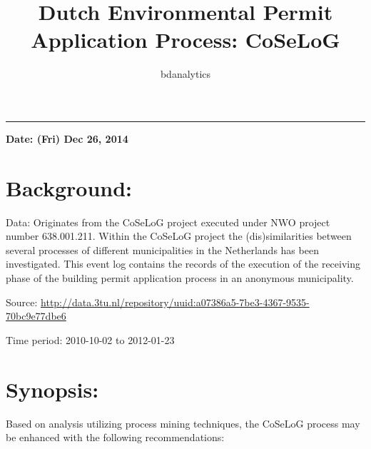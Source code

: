 \documentclass[]{article}
\title{Dutch Environmental Permit Application Process: CoSeLoG}
\author{bdanalytics}
\date{}
\begin{document}
\maketitle


{
\hypersetup{linkcolor=black}
\setcounter{tocdepth}{2}
\tableofcontents
}
\begin{center}\rule{0.5\linewidth}{\linethickness}\end{center}

\textbf{Date: (Fri) Dec 26, 2014}

\section{Background:}\label{background}

Data: Originates from the CoSeLoG project executed under NWO project
number 638.001.211. Within the CoSeLoG project the (dis)similarities
between several processes of different municipalities in the Netherlands
has been investigated. This event log contains the records of the
execution of the receiving phase of the building permit application
process in an anonymous municipality.

Source:
\url{http://data.3tu.nl/repository/uuid:a07386a5-7be3-4367-9535-70bc9e77dbe6}

Time period: 2010-10-02 to 2012-01-23

\section{Synopsis:}\label{synopsis}

Based on analysis utilizing process mining techniques, the CoSeLoG
process may be enhanced with the following recommendations:
\end{document}
